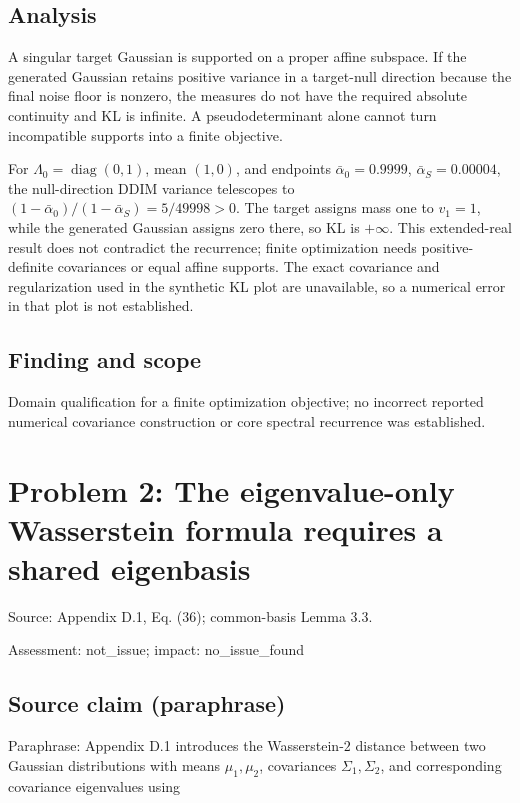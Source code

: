 \documentclass[11pt]{article}
\begin{document}
\subsection*{Analysis}

A singular target Gaussian is supported on a proper affine subspace. If the generated Gaussian retains positive variance in a target-null direction because the final noise floor is nonzero, the measures do not have the required absolute continuity and KL is infinite. A pseudodeterminant alone cannot turn incompatible supports into a finite objective.

For \(\Lambda_0=\operatorname{diag}(0,1)\), mean \((1,0)\), and endpoints \(\bar\alpha_0=0.9999\), \(\bar\alpha_S=0.00004\), the null-direction DDIM variance telescopes to \((1-\bar\alpha_0)/(1-\bar\alpha_S)=5/49998>0\). The target assigns mass one to \(v_1=1\), while the generated Gaussian assigns zero there, so KL is \(+\infty\). This extended-real result does not contradict the recurrence; finite optimization needs positive-definite covariances or equal affine supports. The exact covariance and regularization used in the synthetic KL plot are unavailable, so a numerical error in that plot is not established.

\subsection*{Finding and scope}

Domain qualification for a finite optimization objective; no incorrect reported numerical covariance construction or core spectral recurrence was established.

\section*{Problem 2: The eigenvalue-only Wasserstein formula requires a shared eigenbasis}

Source: Appendix D.1, Eq. (36); common-basis Lemma 3.3.

Assessment: not\_issue; impact: no\_issue\_found

\subsection*{Source claim (paraphrase)}

Paraphrase: Appendix D.1 introduces the Wasserstein-\(2\) distance between two Gaussian distributions with means \(\mu_1,\mu_2\), covariances \(\Sigma_1,\Sigma_2\), and corresponding covariance eigenvalues using
\end{document}
